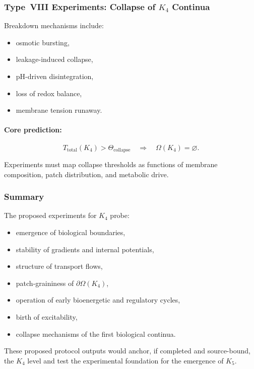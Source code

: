 \subsubsection{Type~VIII Experiments: Collapse of \texorpdfstring{$K_4$}{K_4} Continua}

Breakdown mechanisms include:

\begin{itemize}
    \item osmotic bursting,
    \item leakage-induced collapse,
    \item pH-driven disintegration,
    \item loss of redox balance,
    \item membrane tension runaway.
\end{itemize}

\paragraph{Core prediction:}

\[
   T_{\mathrm{total}}(K_4) > \Theta_{\mathrm{collapse}}
   \quad \Rightarrow \quad
   \Omega(K_4) = \varnothing.
\]

Experiments must map collapse thresholds as functions of membrane composition,
patch distribution, and metabolic drive.



\subsubsection{Summary}

The proposed experiments for $K_4$ probe:

\begin{itemize}
    \item emergence of biological boundaries,
    \item stability of gradients and internal potentials,
    \item structure of transport flows,
    \item patch-graininess of $\partial\Omega(K_4)$,
    \item operation of early bioenergetic and regulatory cycles,
    \item birth of excitability,
    \item collapse mechanisms of the first biological continua.
\end{itemize}

These proposed protocol outputs would anchor, if completed and source-bound, the $K_4$ level and test the
experimental foundation for the emergence of $K_5$.
